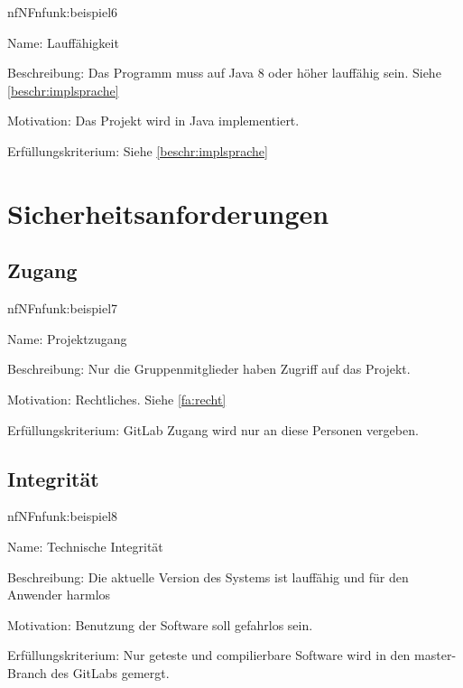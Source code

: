 \begin{description}[leftmargin=5em, style=sameline]	
	\begin{lhp}{nf}{NF}{nfunk:beispiel6}
		\item [Name:] Lauffähigkeit
		\item [Beschreibung:] Das Programm muss auf Java 8 oder höher lauffähig sein. Siehe \ref{beschr:implsprache}
		\item [Motivation:] Das Projekt wird in Java implementiert.
		\item [Erfüllungskriterium:] Siehe \ref{beschr:implsprache}
	\end{lhp}
\end{description}

\section{Sicherheitsanforderungen}

\subsection{Zugang}

\begin{description}[leftmargin=5em, style=sameline]	
	\begin{lhp}{nf}{NF}{nfunk:beispiel7}
		\item [Name:] Projektzugang
		\item [Beschreibung:] Nur die Gruppenmitglieder haben Zugriff auf das Projekt.
		\item [Motivation:] Rechtliches. Siehe \ref{fa:recht}
		\item [Erfüllungskriterium:] GitLab Zugang wird nur an diese Personen vergeben.
	\end{lhp}
\end{description}

\subsection{Integrität}

\begin{description}[leftmargin=5em, style=sameline]	
	\begin{lhp}{nf}{NF}{nfunk:beispiel8}
		\item [Name:] Technische Integrität
		\item [Beschreibung:] Die aktuelle Version des Systems ist lauffähig und für den Anwender harmlos
		\item [Motivation:] Benutzung der Software soll gefahrlos sein.
		\item [Erfüllungskriterium:] Nur geteste und compilierbare Software wird in den master-Branch des GitLabs gemergt.
	\end{lhp}
\end{description}

